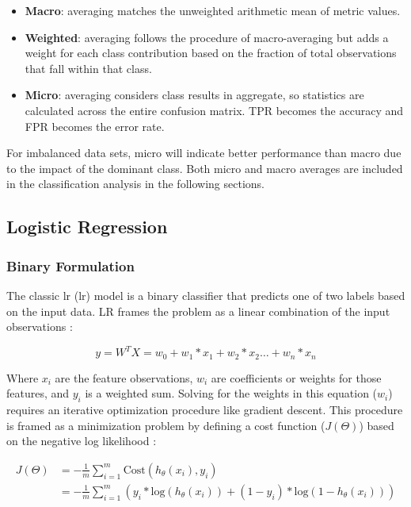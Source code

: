 \begin{itemize}
    \item \textbf{Macro}: averaging matches the unweighted arithmetic mean of metric values.
    \item \textbf{Weighted}: averaging follows the procedure of macro-averaging but adds a weight for each class contribution based on the fraction of total observations that fall within that class. 
    \item \textbf{Micro}: averaging considers class results in aggregate, so statistics are calculated across the entire confusion matrix. TPR becomes the accuracy and FPR becomes the error rate.
\end{itemize}

For imbalanced data sets, micro will indicate better performance than macro due to the impact of the dominant class. Both micro and macro averages are included in the classification analysis in the following sections.

\subsection{Logistic Regression} \label{ch5:log_reg}

\subsubsection{Binary Formulation} 

The classic \acrlong{lr} (\acrshort{lr}) model is a binary classifier that predicts one of two labels based on the input data. LR frames the problem as a linear combination of the input observations \citep[p 369]{bertsimas_analytics_2016}:

\begin{equation}
\label{eq:logreg_form}
    y = W^TX = w_0 + w_1 * x_1 + w_2 * x_2 \ldots + w_n * x_n 
\end{equation}

Where $x_i$ are the feature observations, $w_i$ are coefficients or weights for those features, and $y_i$ is a weighted sum. Solving for the weights in this equation ($w_i$) requires an iterative optimization procedure like gradient descent. This procedure is framed as a minimization problem by defining a cost function ($J(\Theta)$) based on the negative log likelihood \citep{ng_logistic_2011}:

\begin{equation}
\label{eq:logreg_cost}
\begin{aligned}
        J(\Theta) &= -\frac{1}{m} \sum_{i=1}^{m}{\text{Cost}(h_{\theta}(x_i),y_i)} \\ &= -\frac{1}{m}\sum_{i=1}^{m}{(y_i*\text{log}({h_{\theta}(x_i)})+(1-y_i)*\text{log}(1-h_{\theta}(x_i)))}
\end{aligned}
\end{equation}

